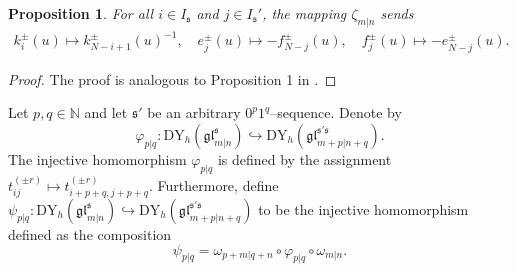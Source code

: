 \documentclass[a4paper,12pt]{article}
\newtheorem{prop}[theo]{Proposition}
\numberwithin{equation}{section}
\begin{document}
\begin{prop}\label{Hom 2}
For all $i\in I_{\mathfrak{s}}$ and $j \in I_{\mathfrak{s}}'$, the mapping $\zeta_{m|n}$ sends  
\begin{gather*}
    k_{i}^{\pm}(u)\mapsto k_{N-i+1}^{\pm}(u)^{-1},\quad e_{j}^{\pm}(u)\mapsto -f_{N-j}^{\pm}(u),\quad f_{j}^{\pm}(u)\mapsto -e_{N-j}^{\pm}(u).
\end{gather*}
\end{prop}
\begin{proof}
The proof is analogous to Proposition 1 in \cite{G07}.
\end{proof}

Let $p,q\in\mathbb{N}$ and let $\mathfrak{s}'$ be an arbitrary $0^{p}1^{q}$--sequence. Denote by
$$
\varphi_{p|q}:\mathrm{DY}_{h}(\mathfrak{gl}_{m|n}^{\mathfrak{s}})\hookrightarrow
\mathrm{DY}_{h}(\mathfrak{gl}_{m+p|n+q}^{\mathfrak{s}'\mathfrak{s}}). 
$$
The injective homomorphism $\varphi_{p|q}$ is defined by the assignment $t_{ij}^{(\pm r)}\mapsto t_{i+p+q,j+p+q}^{(\pm r)}$. Furthermore, define $\psi_{p|q}:\mathrm{DY}_{h}(\mathfrak{gl}_{m|n}^{\mathfrak{s}})\hookrightarrow
\mathrm{DY}_{h}(\mathfrak{gl}_{m+p|n+q}^{\mathfrak{s}'\mathfrak{s}})$ to be the injective homomorphism defined as the composition
$$
\psi_{p|q}=\omega_{p+m|q+n}\circ\varphi_{p|q}\circ\omega_{m|n}.
$$
\end{document}
